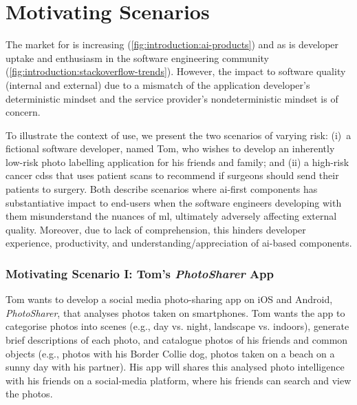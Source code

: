 \section{Motivating Scenarios}
\label{ssec:introduction:motivation}

The market for  is increasing (\cref{fig:introduction:ai-products}) and as is developer uptake and enthusiasm in the software engineering community (\cref{fig:introduction:stackoverflow-trends}). However, the impact to software quality (internal and external) due to a mismatch of the application developer's deterministic  mindset and the service provider's nondeterministic mindset is of concern.

To illustrate the context of use, we present the two scenarios of varying risk: (i)~a fictional software developer, named Tom, who wishes to develop an inherently low-risk photo labelling application for his friends and family; and (ii) a high-risk cancer \gls{cdss} that uses patient scans to recommend if surgeons should send their patients to surgery. Both describe scenarios where \gls{ai}-first components has substantiative impact to end-users when the software engineers developing with them misunderstand the nuances of \gls{ml}, ultimately adversely affecting external quality. Moreover, due to lack of comprehension, this hinders developer experience, productivity, and understanding/appreciation of \gls{ai}-based components.
  
\subsubsection{Motivating Scenario I: Tom's \textit{PhotoSharer} App}
\label{ssec:introduction:motivation:scenario:pam}

Tom wants to develop a social media photo-sharing app on iOS and Android, \textit{PhotoSharer}, that analyses photos taken on smartphones. Tom wants the app to categorise photos into scenes (e.g., day vs. night, landscape vs. indoors), generate brief descriptions of each photo, and catalogue photos of his friends and common objects (e.g., photos with his Border Collie dog, photos taken on a beach on a sunny day with his partner). His app will shares this analysed photo intelligence with his friends on a social-media platform, where his friends can search and view the photos.

